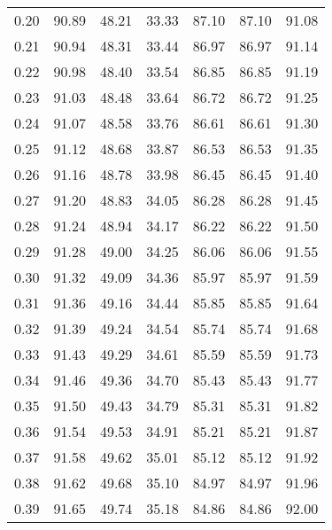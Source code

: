 \begin{tabular}{|c|c|c|c|c|c|c|}
      0.20 &     90.89 &     48.21 &      33.33 &   87.10 &      87.10 &         91.08 \\
      0.21 &     90.94 &     48.31 &      33.44 &   86.97 &      86.97 &         91.14 \\
      0.22 &     90.98 &     48.40 &      33.54 &   86.85 &      86.85 &         91.19 \\
      0.23 &     91.03 &     48.48 &      33.64 &   86.72 &      86.72 &         91.25 \\
      0.24 &     91.07 &     48.58 &      33.76 &   86.61 &      86.61 &         91.30 \\
      0.25 &     91.12 &     48.68 &      33.87 &   86.53 &      86.53 &         91.35 \\
      0.26 &     91.16 &     48.78 &      33.98 &   86.45 &      86.45 &         91.40 \\
      0.27 &     91.20 &     48.83 &      34.05 &   86.28 &      86.28 &         91.45 \\
      0.28 &     91.24 &     48.94 &      34.17 &   86.22 &      86.22 &         91.50 \\
      0.29 &     91.28 &     49.00 &      34.25 &   86.06 &      86.06 &         91.55 \\
      0.30 &     91.32 &     49.09 &      34.36 &   85.97 &      85.97 &         91.59 \\
      0.31 &     91.36 &     49.16 &      34.44 &   85.85 &      85.85 &         91.64 \\
      0.32 &     91.39 &     49.24 &      34.54 &   85.74 &      85.74 &         91.68 \\
      0.33 &     91.43 &     49.29 &      34.61 &   85.59 &      85.59 &         91.73 \\
      0.34 &     91.46 &     49.36 &      34.70 &   85.43 &      85.43 &         91.77 \\
      0.35 &     91.50 &     49.43 &      34.79 &   85.31 &      85.31 &         91.82 \\
      0.36 &     91.54 &     49.53 &      34.91 &   85.21 &      85.21 &         91.87 \\
      0.37 &     91.58 &     49.62 &      35.01 &   85.12 &      85.12 &         91.92 \\
      0.38 &     91.62 &     49.68 &      35.10 &   84.97 &      84.97 &         91.96 \\
      0.39 &     91.65 &     49.74 &      35.18 &   84.86 &      84.86 &         92.00 \\

\end{tabular}
